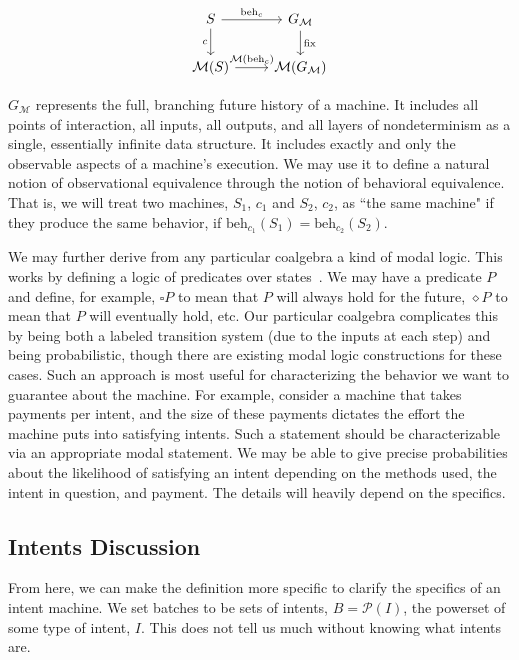 \begin{equation}
\begin{tikzcd}
S \arrow{r}{\text{beh}_c} \arrow[swap]{d}{c} & G_\mathcal{M} \arrow{d}{\text{fix}} \\
\mathcal{M}(S) \arrow{r}{\mathcal{M}(\text{beh}_c)} & \mathcal{M}(G_\mathcal{M})
\end{tikzcd}
\end{equation}

$G_\mathcal{M}$ represents the full, branching future history of a machine. It includes all points of interaction, all inputs, all outputs, and all layers of nondeterminism as a single, essentially infinite data structure. It includes exactly and only the observable aspects of a machine's execution. We may use it to define a natural notion of observational equivalence through the notion of behavioral equivalence. That is, we will treat two machines, $S_1$, $c_1$ and $S_2$, $c_2$, as ``the same machine" if they produce the same behavior, if $\text{beh}_{c_1}(S_1) = \text{beh}_{c_2}(S_2)$.

We may further derive from any particular coalgebra a kind of modal logic. This works by defining a logic of predicates over states~\citep{kupke2011coalgebraic}. We may have a predicate $P$ and define, for example, $\square P$ to mean that $P$ will always hold for the future, $\diamond P$ to mean that $P$ will eventually hold, etc. Our particular coalgebra complicates this by being both a labeled transition system (due to the inputs at each step) and being probabilistic, though there are existing modal logic constructions for these cases. Such an approach is most useful for characterizing the behavior we want to guarantee about the machine. For example, consider a machine that takes payments per intent, and the size of these payments dictates the effort the machine puts into satisfying intents. Such a statement should be characterizable via an appropriate modal statement. We may be able to give precise probabilities about the likelihood of satisfying an intent depending on the methods used, the intent in question, and payment. The details will heavily depend on the specifics.

\subsection{Intents Discussion}

From here, we can make the definition more specific to clarify the specifics of an intent machine. We set batches to be sets of intents, $B = \mathcal{P}(I)$, the powerset of some type of intent, $I$. This does not tell us much without knowing what intents are.

